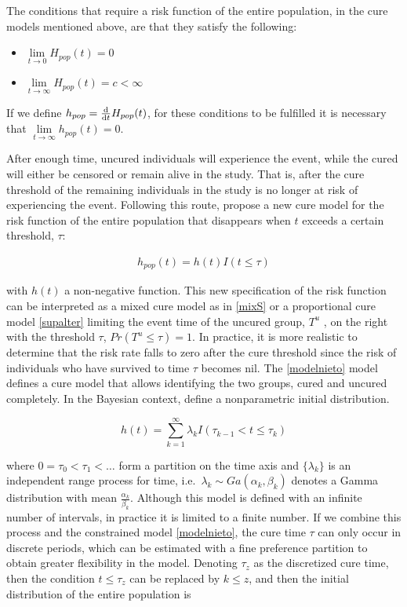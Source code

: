 \documentclass[
]{article}
\begin{document}
The conditions that require a risk function of the entire population, in
the cure models mentioned above, are that they satisfy the following:

\begin{itemize} 
\item $\lim\limits_{t\to0}H_{pop}(t)=0$
\item $\lim\limits_{t\to\infty}H_{pop}(t)= c < \infty$
\end{itemize}

If we define \(h_{pop} = \dv{} {t} H_{pop} (t)\), for these conditions
to be fulfilled it is necessary that
\(\lim \limits_{t \to \infty} h_{pop} (t) = 0\).

After enough time, uncured individuals will experience the event, while
the cured will either be censored or remain alive in the study. That is,
after the cure threshold of the remaining individuals in the study is no
longer at risk of experiencing the event. Following this route,
\citet{Nieto-Barajas2008} propose a new cure model for the risk function
of the entire population that disappears when \(t\) exceeds a certain
threshold, \(\tau\):

\begin{align} \label{modelnieto}
h_{pop}(t)=h(t)I(t\leq\tau)
\end{align}

with \(h(t)\) a non-negative function. This new specification of the
risk function can be interpreted as a mixed cure model as in
\eqref{mixS} or a proportional cure model \eqref{supalter} limiting the
event time of the uncured group, \(T^u\) , on the right with the
threshold \(\tau\), \(Pr (T^u \leq \tau) = 1\). In practice, it is more
realistic to determine that the risk rate falls to zero after the cure
threshold since the risk of individuals who have survived to time
\(\tau\) becomes nil. The \eqref{modelnieto} model defines a cure model
that allows identifying the two groups, cured and uncured completely. In
the Bayesian context, \citet{Nieto-Barajas2008} define a nonparametric
initial distribution.

\[
h(t)=\sum_{k=1}^\infty \lambda_k I(\tau_{k-1}<t\leq \tau_k)
\]

where \(0 = \tau_0 <\tau_1 <\dots\) form a partition on the time axis
and \(\{\lambda_k\}\) is an independent range process for time,
i.e.~\(\lambda_k {\sim} Ga (\alpha_k, \beta_k)\) denotes a Gamma
distribution with mean \(\frac{\alpha_k}{\beta_k}\). Although this model
is defined with an infinite number of intervals, in practice it is
limited to a finite number. If we combine this process and the
constrained model \eqref{modelnieto}, the cure time \(\tau\) can only
occur in discrete periods, which can be estimated with a fine preference
partition to obtain greater flexibility in the model. Denoting
\(\tau_z\) as the discretized cure time, then the condition
\(t \leq \tau_z\) can be replaced by \(k \leq z\), and then the initial
distribution of the entire population is
\end{document}

